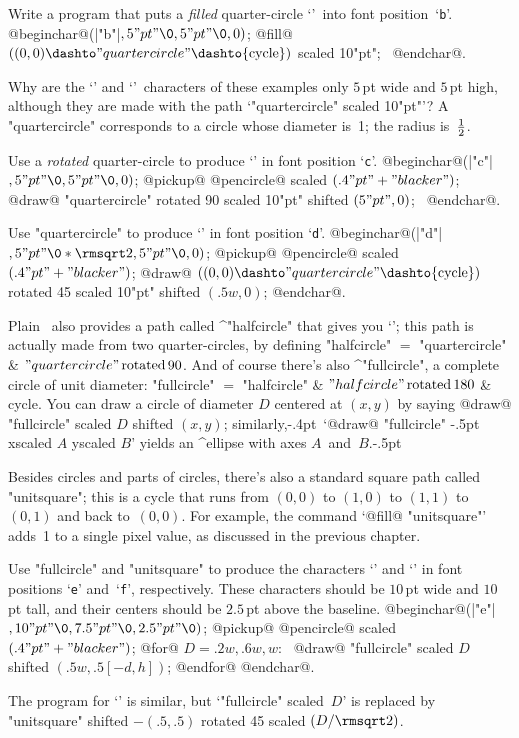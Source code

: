 {{{{\exercise
Write a program that puts a {\sl filled\/} quarter-circle
`\kern1pt{\manual\circb}'\ into font position~`{\tt b}'.
\answer @beginchar@\kern1pt(|"b"|$,5"pt"\0,5"pt"\0,0)$;\parbreak
@fill@ $((0,0)\dashto"quartercircle"\dashto{\rm cycle})$
scaled 10"pt"; \ @endchar@.

\exercise
Why are the `\kern1pt{\manual\circa}' and `\kern1pt{\manual\circb}'\
characters of these examples only $5\,$pt wide and $5\,$pt high, although
they are made with the path `"quartercircle" scaled 10"pt"'?
\answer A "quartercircle" corresponds to a circle whose diameter
is~1; the radius is~$1\over2$.

\dangerexercise
Use a {\sl rotated\/} quarter-circle to produce `{\manual\circc}\kern1pt'
in font position `{\tt c}'.
\answer @beginchar@\kern1pt(|"c"|$,5"pt"\0,5"pt"\0,0)$;\parbreak
@pickup@ @pencircle@ scaled $(.4"pt"+"blacker")$;\parbreak
@draw@ "quartercircle" rotated 90 scaled 10"pt" shifted $(5"pt",0)$;
 \ @endchar@.

\dangerexercise
Use "quartercircle" to produce `\kern1pt{\manual\circd}\kern1pt'
in font position `{\tt d}'.
\answer @beginchar@\kern1pt(|"d"|$,5"pt"\0\ast\rmsqrt2,5"pt"\0,0)$;\parbreak
@pickup@ @pencircle@ scaled $(.4"pt"+"blacker")$;\parbreak
@draw@ $((0,0)\dashto"quartercircle"\dashto{\rm cycle})$
 rotated 45 scaled 10"pt" shifted $(.5w,0)$;\parbreak
@endchar@.

Plain \MF\ also provides a path called ^"halfcircle" that gives you
`{\manual\circc\circa}'; this path is actually made from two
quarter-circles, by defining
\begindisplay
"halfcircle" $=$ "quartercircle" \& $"quartercircle"\,{\rm rotated}\,90$.
\enddisplay
And of course there's also ^"fullcircle", a complete circle of unit diameter:
\begindisplay
"fullcircle" $=$ "halfcircle" \& $"halfcircle"\,{\rm rotated}\,180$ \& cycle.
\enddisplay
You can draw a circle of diameter $D$ centered at $(x,y)$ by saying
\begindisplay
@draw@ "fullcircle" scaled $D$ shifted $(x,y)$;
\enddisplay
similarly,\kern-.4pt\ `@draw@ "fullcircle" \kern-.5pt
xscaled \kern-1pt$A$ yscaled \kern-1pt$B$'
yields an ^{ellipse} with axes $A$~and~$B$\kern-1.3pt.\kern-.5pt

Besides circles and parts of circles, there's also a standard square path
called "unitsquare"; this is a cycle that runs from $(0,0)$ to $(1,0)$
to $(1,1)$ to $(0,1)$ and back to~$(0,0)$. For example, the command
`@fill@ "unitsquare"' adds~1 to a single pixel value, as discussed in
the previous chapter.

\exercise Use "fullcircle" and "unitsquare" to produce the characters
`{\manual\circe}' and `{\manual\circf}' in font positions `{\tt e}'
and~`{\tt f}', respectively. These characters should be $10\,$pt wide
and $10\,$pt tall, and their centers should be $2.5\,$pt above
the baseline.
\answer @beginchar@\kern1pt(|"e"|$,10"pt"\0,7.5"pt"\0,2.5"pt"\0)$;\parbreak
@pickup@ @pencircle@ scaled $(.4"pt"+"blacker")$;\parbreak
@for@ $D=.2w,.6w,w$: \
@draw@ "fullcircle" scaled $D$ shifted $(.5w,.5[-d,h])$;\parbreak
@endfor@ @endchar@.
\par\medskip\noindent
The program for `{\manual\circf}' is similar, but `"fullcircle"
scaled~$D$' is replaced by
\begindisplay
"unitsquare" shifted $-(.5,.5)$ rotated 45 scaled $(D/\rmsqrt2)$.
\enddisplay

}}}}

